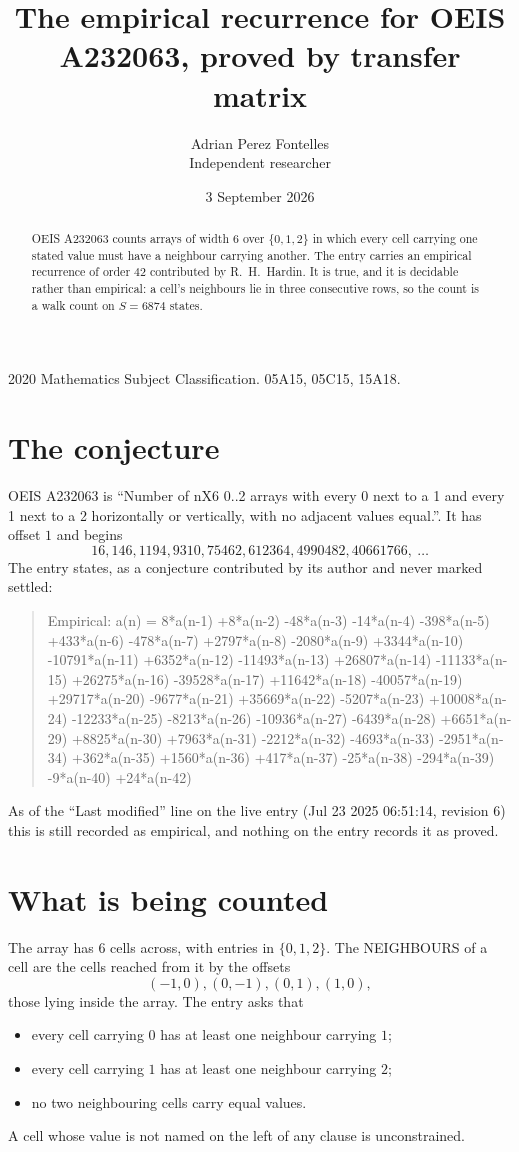 \documentclass[11pt,a4paper]{article}
\title{The empirical recurrence for OEIS A232063, proved by transfer matrix}
\author{Adrian Perez Fontelles\\ \small Independent researcher}
\date{3 September 2026}
\theoremstyle{plain}
\theoremstyle{definition}
\begin{document}
\maketitle

\begin{abstract}
OEIS A232063 counts arrays of width $6$ over $\{0,1,2\}$ in which every cell carrying one stated
value must have a neighbour carrying another. The entry carries an empirical recurrence of
order $42$ contributed by R.~H.~Hardin. It is true, and it is decidable rather than
empirical: a cell's neighbours lie in three consecutive rows, so the count is a walk count on
$S=6874$ states.
\end{abstract}

\noindent\small 2020 Mathematics Subject Classification. 05A15, 05C15, 15A18.\normalsize

\section{The conjecture}

OEIS A232063 is ``Number of nX6 0..2 arrays with every 0 next to a 1 and every 1 next to a 2 horizontally or vertically, with no adjacent values equal.''. It has offset $1$ and begins
\[
16, 146, 1194, 9310, 75462, 612364, 4990482, 40661766,\ \dots
\]
The entry states, as a conjecture contributed by its author and never marked settled:
\begin{quote}
Empirical: a(n) = 8*a(n-1) +8*a(n-2) -48*a(n-3) -14*a(n-4) -398*a(n-5) +433*a(n-6) -478*a(n-7) +2797*a(n-8) -2080*a(n-9) +3344*a(n-10) -10791*a(n-11) +6352*a(n-12) -11493*a(n-13) +26807*a(n-14) -11133*a(n-15) +26275*a(n-16) -39528*a(n-17) +11642*a(n-18) -40057*a(n-19) +29717*a(n-20) -9677*a(n-21) +35669*a(n-22) -5207*a(n-23) +10008*a(n-24) -12233*a(n-25) -8213*a(n-26) -10936*a(n-27) -6439*a(n-28) +6651*a(n-29) +8825*a(n-30) +7963*a(n-31) -2212*a(n-32) -4693*a(n-33) -2951*a(n-34) +362*a(n-35) +1560*a(n-36) +417*a(n-37) -25*a(n-38) -294*a(n-39) -9*a(n-40) +24*a(n-42)
\end{quote}
As of the ``Last modified'' line on the live entry (Jul 23 2025 06:51:14, revision 6) this is still
recorded as empirical, and nothing on the entry records it as proved.

\section{What is being counted}

The array has $6$ cells across, with entries in $\{0,1,2\}$. The NEIGHBOURS of a cell are the
cells reached from it by the offsets
\[
(-1,0), (0,-1), (0,1), (1,0),
\]
those lying inside the array. The entry asks that
\begin{itemize}
\item every cell carrying $0$ has at least one neighbour carrying $1$;
\item every cell carrying $1$ has at least one neighbour carrying $2$;
\item no two neighbouring cells carry equal values.
\end{itemize}
A cell whose value is not named on the left of any clause is unconstrained.
\end{document}
